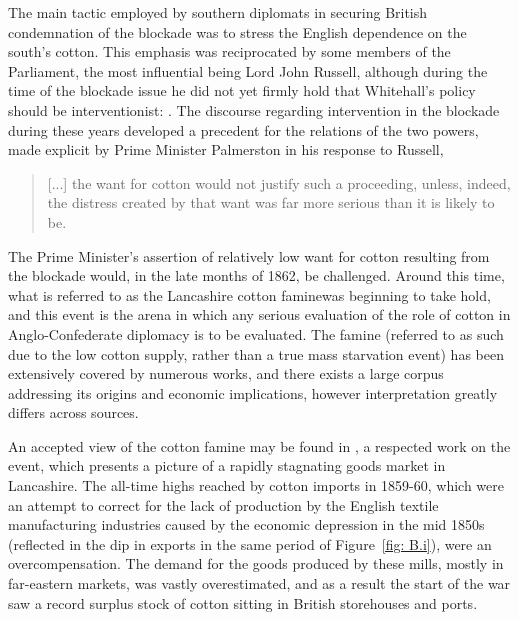 The main tactic employed by southern diplomats in securing British condemnation of the blockade was to stress the English dependence 
on the south's cotton. This emphasis was reciprocated by some members of the Parliament, the most influential being Lord John Russell, although 
during the time of the blockade issue he did not yet firmly hold that Whitehall's policy should be interventionist: . \autocite[Russell $\rightarrow$ Palmerston, quoted in][Vol.I, p.199. There are two possible readings of what Russell said here, resting on one's interpretation of the phrase "It will not do". I have chosen to understand it, as I believe fits most reasonably within the context of the quote, as indicative of Russell's reservations regarding the breaking of the blockade, rather than a feeling that this action does not go far enough.]{adamsBritainAmericanWar1925}
The discourse regarding intervention in the blockade during these years developed a precedent for the relations of the two powers, made explicit by Prime Minister 
Palmerston in his response to Russell,
\begin{quote}
    [...] the want for cotton would not justify such a proceeding, unless, indeed, the distress created by that want was far more serious than it is likely to be.
    \Autocite[Palmerston $\rightarrow$ Russell, quoted in][Vol.I, p.199]{adamsBritainAmericanWar1925}
\end{quote}

\hfill

The Prime Minister's assertion of relatively low want for cotton resulting from the blockade would, in the late months of 1862, be challenged. Around this time,
what is referred to as the \flq Lancashire cotton famine\frq was beginning to take hold, and this event is the arena in which any serious evaluation
of the role of cotton in Anglo-Confederate diplomacy is to be evaluated. The famine (referred to as such due to the low cotton supply, rather than 
a true mass starvation event) has been extensively covered by numerous works, and there exists a large corpus addressing its origins and 
economic implications, however interpretation greatly differs across sources. 

An accepted view of the cotton famine may be found in , a respected work on the event, which 
presents a picture of a rapidly stagnating goods market in Lancashire\autocite[78]{arnoldHistoryCotton1864}. The all-time highs reached by cotton imports 
in 1859-60, which were an attempt to correct for the lack of production by the English textile manufacturing industries caused by the 
economic depression in the mid 1850s (reflected in the dip in exports in the same period of Figure~\ref{fig: B.i}), were an 
overcompensation. The demand for the goods produced by these mills, mostly in far-eastern markets, was vastly overestimated, and as a result 
the start of the war saw a record surplus stock of cotton sitting in British storehouses and ports. 

